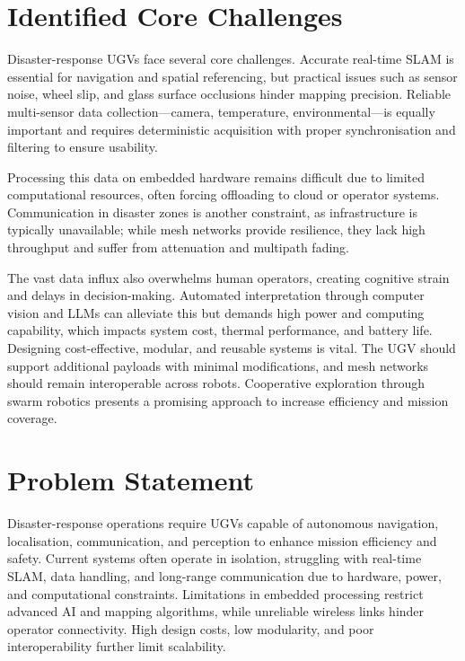 \section{Identified Core Challenges}
\label{sec:challenges}

Disaster-response UGVs face several core challenges. Accurate real-time SLAM is essential for navigation and spatial referencing, but practical issues such as sensor noise, wheel slip, and glass surface occlusions hinder mapping precision. Reliable multi-sensor data collection---camera, temperature, environmental---is equally important and requires deterministic acquisition with proper synchronisation and filtering to ensure usability.

Processing this data on embedded hardware remains difficult due to limited computational resources, often forcing offloading to cloud or operator systems. Communication in disaster zones is another constraint, as infrastructure is typically unavailable; while mesh networks provide resilience, they lack high throughput and suffer from attenuation and multipath fading.

The vast data influx also overwhelms human operators, creating cognitive strain and delays in decision-making. Automated interpretation through computer vision and LLMs can alleviate this but demands high power and computing capability, which impacts system cost, thermal performance, and battery life. Designing cost-effective, modular, and reusable systems is vital. The UGV should support additional payloads with minimal modifications, and mesh networks should remain interoperable across robots. Cooperative exploration through swarm robotics presents a promising approach to increase efficiency and mission coverage.

\section{Problem Statement}
\label{sec:problem}

Disaster-response operations require UGVs capable of autonomous navigation, localisation, communication, and perception to enhance mission efficiency and safety. Current systems often operate in isolation, struggling with real-time SLAM, data handling, and long-range communication due to hardware, power, and computational constraints. Limitations in embedded processing restrict advanced AI and mapping algorithms, while unreliable wireless links hinder operator connectivity. High design costs, low modularity, and poor interoperability further limit scalability.

